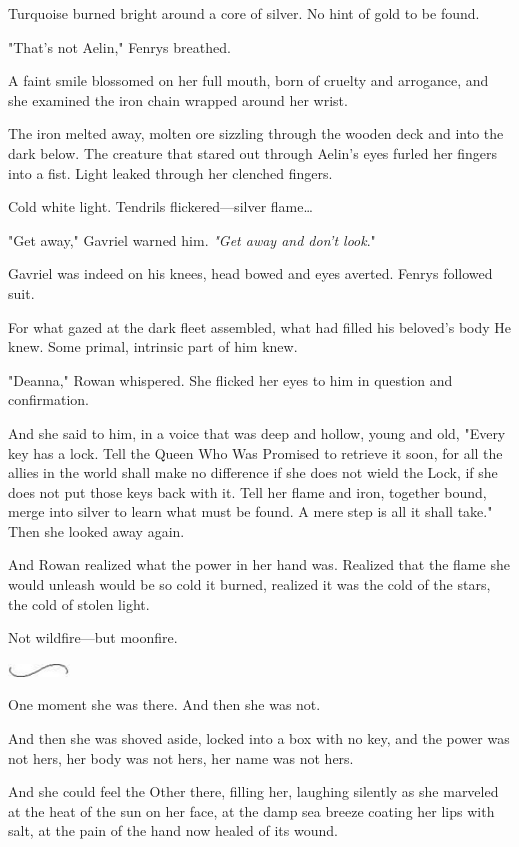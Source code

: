 Turquoise burned bright  around a core of silver. No hint of gold to be found.

"That's not Aelin," Fenrys breathed.

A faint smile blossomed on her full mouth, born of cruelty and arrogance, and she examined the iron chain wrapped around her wrist.

The iron melted away, molten ore sizzling through the wooden deck and into the dark below. The creature that stared out through Aelin's eyes furled her fingers into a fist. Light leaked through her clenched fingers.

Cold white light. Tendrils flickered---silver flame\ldots{}

"Get away," Gavriel warned him. \emph{"Get away and don't look}."

Gavriel was indeed on his knees, head bowed and eyes averted. Fenrys followed suit.

For what gazed at the dark fleet assembled, what had filled his beloved's body  He knew. Some primal, intrinsic part of him knew.

"Deanna," Rowan whispered. She flicked her eyes to him in question and confirmation.

And she said to him, in a voice that was deep and hollow, young and old, "Every key has a lock. Tell the Queen Who Was Promised to retrieve it soon, for all the allies in the world shall make no difference if she does not wield the Lock, if she does not put those keys back with it. Tell her flame and iron, together bound, merge into silver to learn what must be found. A mere step is all it shall take." Then she looked away again.

And Rowan realized what the power in her hand was. Realized that the flame she would unleash would be so cold it burned, realized it was the cold of the stars, the cold of stolen light.

Not wildfire---but moonfire.

\includegraphics[width=0.65in,height=0.13in]{images/seperator}

One moment she was there. And then she was not.

And then she was shoved aside, locked into a box with no key, and the power was not hers, her body was not hers, her name was not hers.

And she could feel the Other there, filling her, laughing silently as she marveled at the heat of the sun on her face, at the damp sea breeze coating her lips with salt, at the pain of the hand now healed of its wound.


